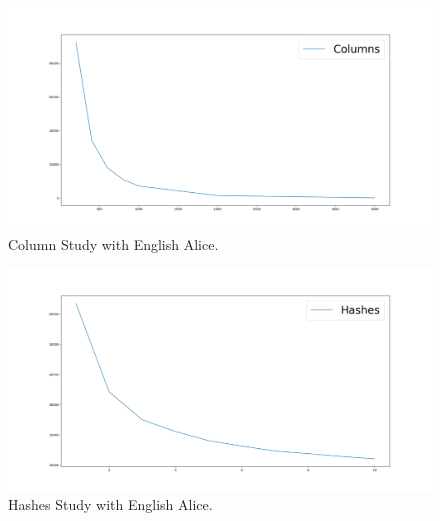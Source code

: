 \documentclass[shortpaper]{revdetua}
\begin{document}
\begin{figure}[h]
    \centering
    \setlength{\belowcaptionskip}{-12pt}
    \includegraphics[width=\linewidth]{englishAliceColumnStudy200_4000.png}
    \caption{Column Study with English Alice.} 
    \label{fig:columnStudy}
\end{figure}

\begin{figure}[h]
    \centering
    \setlength{\belowcaptionskip}{-12pt}
    \includegraphics[width=\linewidth]{englishAliceHashesStudy1_10.png}
    \caption{Hashes Study with English Alice.} 
    \label{fig:hashStudy}
\end{figure}
\end{document}
